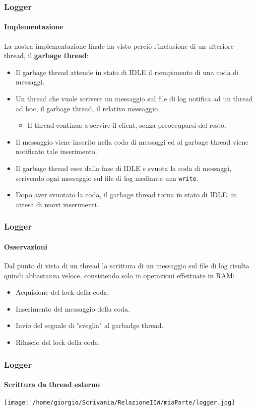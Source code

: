 \documentclass{beamer}
\begin{document}
\begin{frame}
\frametitle{Logger}
\framesubtitle{Implementazione}
La nostra implementazione finale ha visto perciò l’inclusione di un ulteriore
thread, il \textbf{garbage thread}:
\begin{itemize}
\item Il garbage thread attende in stato di IDLE il riempimento di una coda di
messaggi.
\item Un thread che vuole scrivere un messaggio sul file di log notifica ad un thread
ad hoc, il garbage thread, il relativo messaggio
\begin{itemize}
\item Il thread continua a servire il client, senza preoccuparsi del resto.
\end{itemize}
\item Il messaggio viene inserito nella coda di messaggi ed al garbage thread viene
notificato tale inserimento.
\item Il garbage thread esce dalla fase di IDLE e svuota la coda di messaggi,
scrivendo ogni messaggio sul file di log mediante una \texttt{write}.
\item Dopo aver svuotato la coda, il garbage thread torna in stato di IDLE, in attesa di
nuovi inserimenti.

\end{itemize}

\end{frame}
\begin{frame}
\frametitle{Logger}
\framesubtitle{Osservazioni}
Dal punto di vista di un thread la scrittura di un messaggio sul file di log risulta
quindi abbastanza veloce, consistendo solo in operazioni effettuate in RAM:
\begin{itemize}
\item Acquisione del lock della coda.
\item Inserimento del messaggio della coda.
\item Invio del segnale di "sveglia" al garbadge thread.
\item Rilascio del lock della coda.
\end{itemize}
\end{frame}

\begin{frame}
\frametitle{Logger}
\framesubtitle{Scrittura da thread esterno}

\begin{center}
\texttt{[image: /home/giorgio/Scrivania/RelazioneIIW/miaParte/logger.jpg]}
\end{center}



\end{frame}
\end{document}
